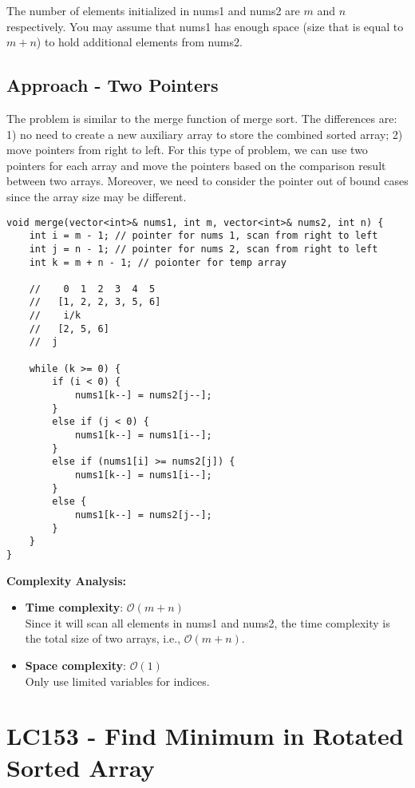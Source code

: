 \documentclass[justified]{tufte-book}
\begin{document}
The number of elements initialized in nums1 and nums2 are $m$ and $n$ respectively. You may assume that nums1 has enough space (size that is equal to $m + n$) to hold additional elements from nums2.

\subsection{Approach - Two Pointers}
The problem is similar to the merge function of merge sort. The differences are: 1) no need to create a new auxiliary array to store the combined sorted array; 2) move pointers from right to left. For this type of problem, we can use two pointers for each array and move the pointers based on the comparison result between two arrays. Moreover, we need to consider the pointer out of bound cases since the array size may be different. 

\begin{lstlisting}
void merge(vector<int>& nums1, int m, vector<int>& nums2, int n) {
    int i = m - 1; // pointer for nums 1, scan from right to left
    int j = n - 1; // pointer for nums 2, scan from right to left
    int k = m + n - 1; // poionter for temp array
    
    //    0  1  2  3  4  5
    //   [1, 2, 2, 3, 5, 6]
    //    i/k 
    //   [2, 5, 6]
    //  j
    
    while (k >= 0) {
        if (i < 0) {
            nums1[k--] = nums2[j--];
        }
        else if (j < 0) {
            nums1[k--] = nums1[i--];
        }
        else if (nums1[i] >= nums2[j]) {
            nums1[k--] = nums1[i--];
        }
        else {
            nums1[k--] = nums2[j--];
        }
    }
}
\end{lstlisting}
\noindent \textbf{Complexity Analysis:}
\begin{itemize}
    \item \textbf{Time complexity}: $\mathcal{O}(m + n)$ \\
    Since it will scan all elements in nums1 and nums2, the time complexity is the total size of two arrays, i.e., $\mathcal{O}(m + n)$.
    \item \textbf{Space complexity}: $\mathcal{O}(1)$ \\
    Only use limited variables for indices.
\end{itemize}

\section{LC153 - Find Minimum in Rotated Sorted Array} \label{sec:lc153_find_min_rotated_sorted_array}
\end{document}
